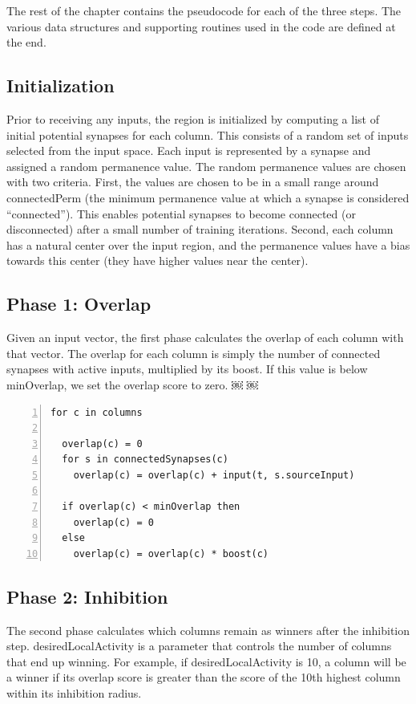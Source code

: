 \documentclass{report}
\begin{document}
The rest of the chapter contains the pseudocode for each of the three
steps. The various data structures and supporting routines used in the
code are defined at the end.

\subsection*{Initialization}

Prior to receiving any inputs, the region is initialized by computing
a list of initial potential synapses for each column. This consists of
a random set of inputs selected from the input space. Each input is
represented by a synapse and assigned a random permanence value. The
random permanence values are chosen with two criteria. First, the
values are chosen to be in a small range around connectedPerm (the
minimum permanence value at which a synapse is considered
``connected''). This enables potential synapses to become connected (or
disconnected) after a small number of training iterations. Second,
each column has a natural center over the input region, and the
permanence values have a bias towards this center (they have higher
values near the center).

\subsection*{Phase 1: Overlap}

Given an input vector, the first phase calculates the overlap of each
column with that vector. The overlap for each column is simply the
number of connected synapses with active inputs, multiplied by its
boost. If this value is below minOverlap, we set the overlap score to
zero.  ￼ ￼

\begin{lstlisting}[numbers=left]
for c in columns

  overlap(c) = 0
  for s in connectedSynapses(c)
    overlap(c) = overlap(c) + input(t, s.sourceInput)

  if overlap(c) < minOverlap then
    overlap(c) = 0
  else
    overlap(c) = overlap(c) * boost(c)
\end{lstlisting}

\subsection*{Phase 2: Inhibition}
The second phase calculates which columns remain as winners after the
inhibition step. desiredLocalActivity is a parameter that controls the
number of columns that end up winning. For example, if
desiredLocalActivity is 10, a column will be a winner if its overlap
score is greater than the score of the 10th highest column within its
inhibition radius.
\end{document}
